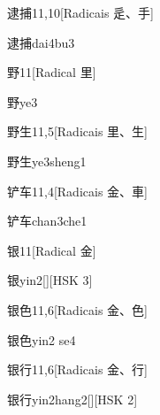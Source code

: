 \begin{entry}{逮捕}{11,10}[Radicais ⾡、⼿]
  \begin{phonetics}{逮捕}{dai4bu3}
  \end{phonetics}
\end{entry}

\begin{entry}{野}{11}[Radical ⾥]
  \begin{phonetics}{野}{ye3}
  \end{phonetics}
\end{entry}

\begin{entry}{野生}{11,5}[Radicais ⾥、⽣]
  \begin{phonetics}{野生}{ye3sheng1}
  \end{phonetics}
\end{entry}

\begin{entry}{铲车}{11,4}[Radicais ⾦、⾞]
  \begin{phonetics}{铲车}{chan3che1}
  \end{phonetics}
\end{entry}

\begin{entry}{银}{11}[Radical ⾦]
  \begin{phonetics}{银}{yin2}[][HSK 3]
  \end{phonetics}
\end{entry}

\begin{entry}{银色}{11,6}[Radicais ⾦、⾊]
  \begin{phonetics}{银色}{yin2 se4}
  \end{phonetics}
\end{entry}

\begin{entry}{银行}{11,6}[Radicais ⾦、⾏]
  \begin{phonetics}{银行}{yin2hang2}[][HSK 2]
  \end{phonetics}
\end{entry}

